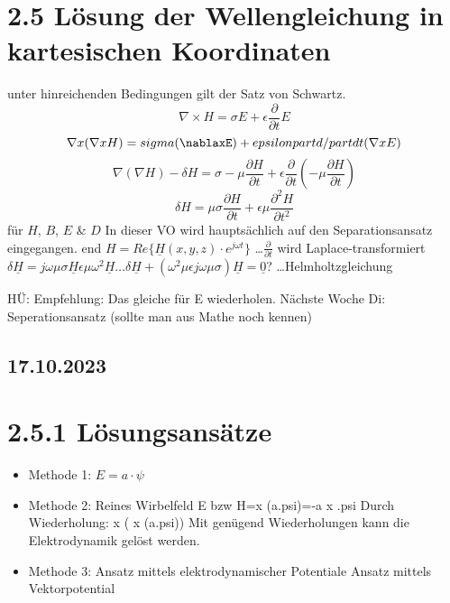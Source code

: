 \documentclass[a4paper]{article}
\begin{document}
\section*{2.5 Lösung der Wellengleichung in kartesischen Koordinaten}
 unter hinreichenden Bedingungen gilt der Satz von Schwartz.
\[\nabla \times H = \sigma E +\epsilon \frac{\partial}{\partial t}  E\]
\[\nabla x (\nabla x H) = sigma(\nablaxE)+epsilon partd/partdt(\nabla x E)\]
\[\nabla(\nabla H)-\delta H = \sigma-\mu \frac{\partial H}{\partial t} + \epsilon \frac{\partial }{\partial t}(-\mu \frac{\partial H}{\partial t})\]
\[\delta H = \mu \sigma \frac{\partial H}{\partial t} + \epsilon\mu \frac{\partial ^2 H}{\partial t^2}\] \ldotsTelegraphengleichung für $H$,  $B$, $E$ \& $D$\newline
In dieser VO wird hauptsächlich auf den Separationsansatz eingegangen.
end
$H=Re\{\underline{H}(x,y,z)\cdot e^{j\omega t}\}$ \ldots $\frac{\partial }{\partial t}$ wird Laplace-transformiert\newline
$\delta \underline{H} = j\omega\mu\sigma\underline{H}\epsilon\mu\omega^2 \underline{H}\ldots \delta \underline{H}+(\omega^2 \mu\epsilon j\omega\mu\sigma)\underline{H} = \underline{0}$? \ldots Helmholtzgleichung\newline

HÜ: Empfehlung: Das gleiche für E wiederholen.
Nächste Woche Di: Seperationsansatz (sollte man aus Mathe noch kennen)

\subsection*{17.10.2023}
\section*{2.5.1 Lösungsansätze}
\begin{itemize}
    \item Methode 1: $E=a\cdot \psi$\newline
    \item Methode 2:\newline
    Reines Wirbelfeld E bzw H=\nabla x (a.psi)=-a x \nabla.psi
    Durch Wiederholung: \nabla x ( \nabla x (a.psi))
    Mit genügend Wiederholungen kann die Elektrodynamik gelöst werden.
    \item Methode 3: Ansatz mittels elektrodynamischer Potentiale
    Ansatz mittels Vektorpotential
\end{itemize}
\end{document}
